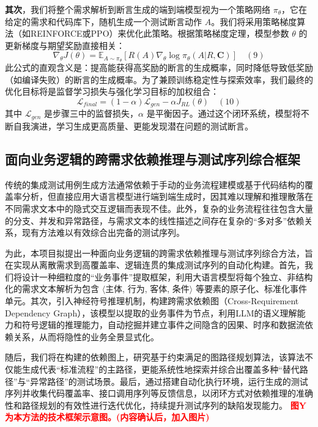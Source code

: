 \documentclass[12pt]{article}
\begin{document}
\textbf{其次}，我们将整个需求解析到断言生成的端到端模型视为一个策略网络 $\pi_{\theta}$，它在给定的需求和代码库下，随机生成一个测试断言动作 $A$。我们将采用策略梯度算法（如REINFORCE或PPO）来优化此策略。根据策略梯度定理，模型参数 $\theta$ 的更新梯度与期望奖励直接相关：
$$
\nabla_{\theta} J(\theta) = \mathbb{E}_{A \sim \pi_{\theta}} [R(A) \nabla_{\theta} \log \pi_{\theta}(A | R, \mathbf{C})] \quad (9)
$$
此公式的直观含义是：提高能获得高奖励的断言的生成概率，同时降低导致低奖励（如编译失败）的断言的生成概率。为了兼顾训练稳定性与探索效率，我们最终的优化目标将是监督学习损失与强化学习目标的加权组合：
$$
\mathcal{L}_{final} = (1-\alpha) \mathcal{L}_{gen} - \alpha J_{RL}(\theta) \quad (10)
$$
其中 $\mathcal{L}_{gen}$ 是步骤三中的监督损失，$\alpha$ 是平衡因子。通过这个闭环系统，模型将不断自我演进，学习生成更高质量、更能发现潜在问题的测试断言。






















\subsection{面向业务逻辑的跨需求依赖推理与测试序列综合框架}

传统的集成测试用例生成方法通常依赖于手动的业务流程建模或基于代码结构的覆盖率分析，但直接应用大语言模型进行端到端生成时，因其难以理解和推理散落在不同需求文本中的隐式交互逻辑而表现不佳。此外，复杂的业务流程往往包含大量的分支、并发和异常路径，与需求文本的线性描述之间存在复杂的“多对多”依赖关系，现有方法难以有效综合出完备的测试序列。

为此，本项目拟提出一种面向业务逻辑的跨需求依赖推理与测试序列综合方法，旨在实现从离散需求到高覆盖率、逻辑连贯的集成测试序列的自动化构建。首先，我们将设计一种细粒度的“业务事件”提取框架，利用大语言模型将每个独立、非结构化的需求文本解析为包含 $\langle$主体, 行为, 客体, 条件$\rangle$ 等要素的原子化、标准化事件单元。其次，引入神经符号推理机制，构建跨需求依赖图（Cross-Requirement Dependency Graph），该模型以提取的业务事件为节点，利用LLM的语义理解能力和符号逻辑的推理能力，自动挖掘并建立事件之间隐含的因果、时序和数据流依赖关系，从而将隐性的业务全景显式化。

随后，我们将在构建的依赖图上，研究基于约束满足的图路径规划算法，该算法不仅能生成代表“标准流程”的主路径，更能系统性地探索并综合出覆盖多种“替代路径”与“异常路径”的测试场景。最后，通过搭建自动化执行环境，运行生成的测试序列并收集代码覆盖率、接口调用序列等反馈信息，以闭环方式对依赖推理的准确性和路径规划的有效性进行迭代优化，持续提升测试序列的缺陷发现能力。
\textcolor{red}{\textbf{图Y为本方法的技术框架示意图。(内容确认后，加入图片)}}
\end{document}
